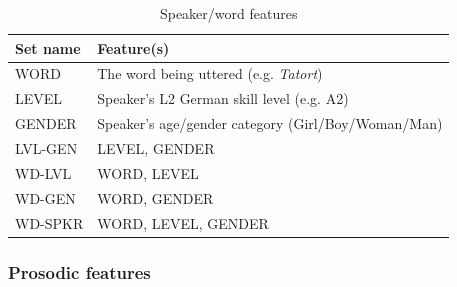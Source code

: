 \begin{table}
			\begin{subtable}[h]{\textwidth}
				\centering
				\caption{Speaker/word features  }
				\begin{tabular}{ll}
				\toprule
				Set name & Feature(s) \\
				\midrule
				WORD & The word being uttered (e.g. \textit{Tatort}) \\
				LEVEL & Speaker's L2 German skill level (e.g. A2)\\
				GENDER & Speaker's age/gender category (Girl/Boy/Woman/Man)\\
				LVL-GEN & LEVEL, GENDER \\
				WD-LVL & WORD, LEVEL \\
				WD-GEN & WORD, GENDER \\
				WD-SPKR & WORD, LEVEL, GENDER \\
				\bottomrule
				\end{tabular}
				\label{tab:features:sets:spkrword}		
			\end{subtable}
				
			\label{tab:features:sets}
		\end{table}
		
		
		\subsubsection{Prosodic features}
		\label{sec:classification:features:prosodic}
		
		
